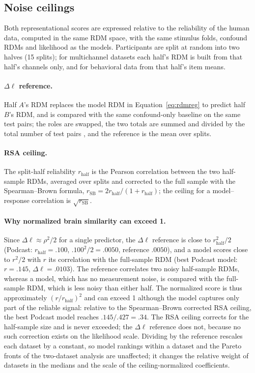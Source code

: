\subsection{Noise ceilings}
\label{app:rsa-ceilings}

Both representational scores are expressed relative to the reliability of the human data, computed in the same RDM space, with the same stimulus folds, confound RDMs and likelihood as the models. Participants are split at random into two halves (15 splits); for multichannel datasets each half's RDM is built from that half's channels only, and for behavioral data from that half's item means.

\paragraph{$\Delta\ell$ reference.} Half $A$'s RDM replaces the model RDM in Equation~\ref{eq:rdmreg} to predict half $B$'s RDM, and is compared with the same confound-only baseline on the same test pairs; the roles are swapped, the two totals are summed and divided by the total number of test pairs \citep{timkey2026dissociation}, and the reference is the mean over splits.

\paragraph{RSA ceiling.} The split-half reliability $r_{\mathrm{half}}$ is the Pearson correlation between the two half-sample RDMs, averaged over splits and corrected to the full sample with the Spearman--Brown formula, $r_{\mathrm{SB}}=2r_{\mathrm{half}}/(1+r_{\mathrm{half}})$; the ceiling for a model--response correlation is $\sqrt{r_{\mathrm{SB}}}$.

\paragraph{Why normalized brain similarity can exceed 1.} Since $\Delta\ell\approx\rho^2/2$ for a single predictor, the $\Delta\ell$ reference is close to $r_{\mathrm{half}}^2/2$ (Podcast: $r_{\mathrm{half}}=.100$, $.100^2/2=.0050$, reference $.0050$), and a model scores close to $r^2/2$ with $r$ its correlation with the full-sample RDM (best Podcast model: $r=.145$, $\Delta\ell=.0103$). The reference correlates two noisy half-sample RDMs, whereas a model, which has no measurement noise, is compared with the full-sample RDM, which is less noisy than either half. The normalized score is thus approximately $(r/r_{\mathrm{half}})^2$ and can exceed 1 although the model captures only part of the reliable signal: relative to the Spearman--Brown corrected RSA ceiling, the best Podcast model reaches $.145/.427=.34$. The RSA ceiling corrects for the half-sample size and is never exceeded; the $\Delta\ell$ reference does not, because no such correction exists on the likelihood scale. Dividing by the reference rescales each dataset by a constant, so model rankings within a dataset and the Pareto fronts of the two-dataset analysis are unaffected; it changes the relative weight of datasets in the medians and the scale of the ceiling-normalized coefficients.


